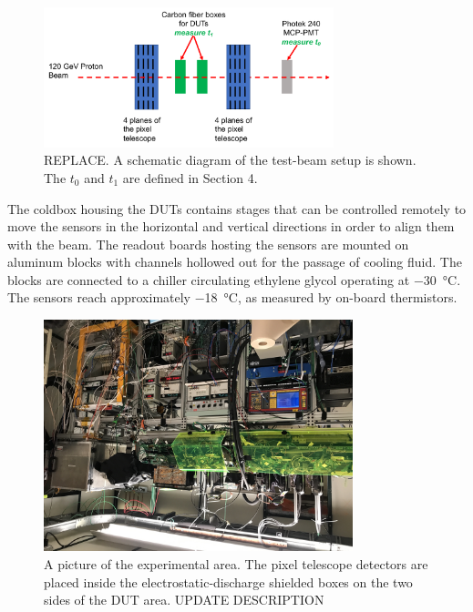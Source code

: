 \documentclass[preprint,1p]{elsarticle}
\begin{document}
\begin{figure}[htbp] 
\centering
\includegraphics[width=0.75\textwidth]{fig/BeamSetup.pdf} 
\caption{REPLACE. A schematic diagram of the test-beam setup is shown. The $t_0$ and $t_1$ are defined in Section 4.} 
\label{fig:DragonBoxDiagram} 
\end{figure} 

The coldbox housing the DUTs contains stages that can be controlled remotely to move the sensors in the horizontal and vertical directions in order to align them with the beam. 
The readout boards hosting the sensors are mounted on aluminum blocks with channels hollowed out for the passage of cooling fluid. The blocks are connected to a chiller circulating ethylene glycol operating at \SI{-30}{\celsius}. The sensors reach approximately \SI{-18}{\celsius}, as measured by on-board thermistors.

\begin{figure}[htbp] 
\centering
\includegraphics[width=0.8\textwidth,angle=180]{fig/ftbf_setup} 
\caption{A picture of the experimental area. The pixel telescope detectors are placed inside the 
electrostatic-discharge shielded boxes on the two sides of the DUT area. UPDATE DESCRIPTION} 
\label{fig:DragonBox} 
\end{figure} 
\end{document}
